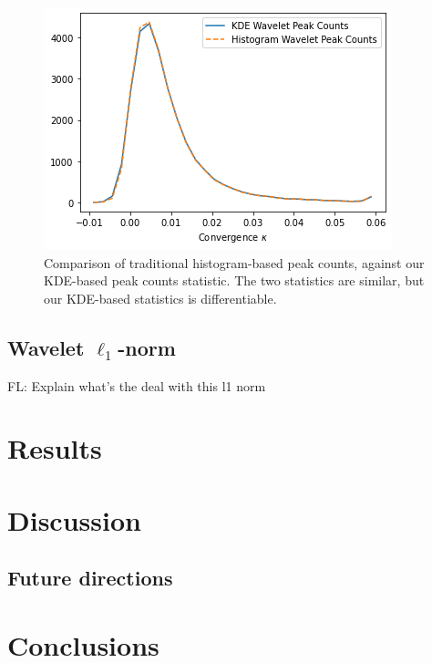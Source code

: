 \documentclass[twocolumn,twocolappendix]{aastex63}
\newcommand{\EiffL}[1]{{\color{cyan}FL: #1}}
\begin{document}
\begin{figure}
    \centering
    \includegraphics[width=\columnwidth]{figures/peakcounts.png}
    \caption{Comparison of traditional histogram-based peak counts, against our  KDE-based peak counts statistic. The two statistics are similar, but our KDE-based statistics is differentiable.}
    \label{fig:comp_statistics}
\end{figure}


\subsection{Wavelet $\ell_1$-norm}

\EiffL{Explain what's the deal with this l1 norm}




\section{Results}

\section{Discussion}

\subsection{Future directions}

\section{Conclusions}

\end{document}
